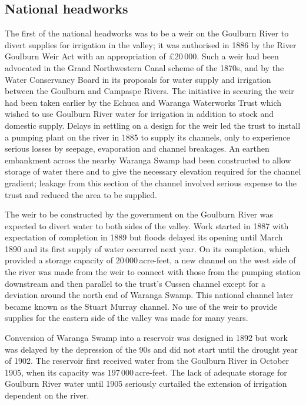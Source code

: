\subsection*{National headworks} 

The first of the national headworks was to be a weir on the Goulburn
River  to divert supplies for irrigation in the
valley; it was authorised in 1886 by the River Goulburn Weir Act
 with
an appropriation of \pounds20\,000.  Such a weir had been advocated in
the Grand Northwestern Canal scheme  of the 1870s, and by the Water Conservancy Board in its
proposals for water supply and irrigation between the Goulburn and
Campaspe Rivers.  The initiative in securing the weir had been taken
earlier by the Echuca and Waranga Waterworks Trust
 which wished to use
Goulburn River water for irrigation in addition to stock and domestic
supply.  Delays in settling on a design for the weir led the trust to
install a pumping plant on the river in 1885 to supply its channels,
only to experience serious losses by seepage, evaporation and channel
breakages.  An earthen embankment across the nearby Waranga Swamp had
been constructed to allow storage of water there and to give the
necessary elevation required for the channel gradient; leakage from
this section of the channel involved serious expense to the trust and
reduced the area to be supplied.

The weir  to be constructed by the government on
the Goulburn River was expected to divert water to both sides of the
valley.  Work started in 1887 with expectation of completion in 1889
but floods delayed its opening until March 1890 and its first supply
of water occurred next year.  On its completion, which provided a
storage capacity of 20\,000\,ac\-re-feet, a new channel on the west
side of the river was made from the weir to connect with those from
the pumping station downstream and then parallel to the trust's Cussen
channel except for a deviation around the north end of Waranga Swamp.
This national channel later became known as the Stuart Murray channel.
No use of the weir to provide supplies for the eastern side of the
valley was made for many years.

Conversion of Waranga Swamp into a reservoir 
was designed in 1892 but work was delayed by the depression of the 90s
and did not start until the drought year of 1902.  The reservoir first
received water from the Goulburn River \index{river!Goulburn} in
October 1905, when its capacity was 197\,000\,acre-feet.  The lack of
adequate storage for Goulburn River water until 1905 seriously
curtailed the extension of irrigation dependent on the
river.

